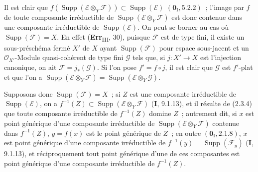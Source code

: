 Il est clair que
$f(\operatorname{Supp}(\mathscr E\otimes_Y\mathscr F))
\subset\operatorname{Supp}(\mathscr E)$ $(\mathbf{0}_{\mathrm I},5.2.2)$~; l'image
par $f$ de toute composante irréductible de
$\operatorname{Supp}(\mathscr E\otimes_Y\mathscr F)$ est donc contenue dans
une composante irréductible de $\operatorname{Supp}(\mathscr E)$. On peut se
borner au cas où $\operatorname{Supp}(\mathscr F)=X$. En effet
(\textbf{Err}\textsubscript{III}, 30), puisque $\mathscr F$ est de
type fini, il existe un sous-préschéma fermé $X'$ de $X$ ayant
$\operatorname{Supp}(\mathscr F)$ pour espace sous-jacent et un
$\mathcal O_{X'}$-Module quasi-cohérent de type fini $\mathscr G$ tels que,
si $j:X'\to X$ est l'injection canonique, on ait
$\mathscr F=j_*(\mathscr G)$. Si l'on pose $f'=f\circ j$, il est clair que
$\mathscr G$ est $f'$-plat et que l'on a
$\operatorname{Supp}(\mathscr E\otimes_Y\mathscr F)
=\operatorname{Supp}(\mathscr E\otimes_Y\mathscr G)$.

Supposons donc $\operatorname{Supp}(\mathscr F)=X$~; si $Z$ est une
composante irréductible de $\operatorname{Supp}(\mathscr E)$, on a
$f^{-1}(Z)\subset\operatorname{Supp}(\mathscr E\otimes_Y\mathscr F)$
(\textbf{I}, 9.1.13),
et il résulte de (2.3.4) que toute composante irréductible de $f^{-1}(Z)$
domine $Z$~; autrement dit, si $x$ est point générique d'une composante
irréductible de $\operatorname{Supp}(\mathscr E\otimes_Y\mathscr F)$
contenue dans $f^{-1}(Z)$, $y=f(x)$ est le point générique de $Z$~; en outre
$(\mathbf{0}_{\mathrm I},2.1.8)$, $x$ est point générique d'une composante
irréductible de
$f^{-1}(y)=\operatorname{Supp}(\mathscr F_y)$ (\textbf{I}, 9.1.13), et
réciproquement tout point générique d'une de ces composantes est point
générique d'une composante irréductible de $f^{-1}(Z)$.

